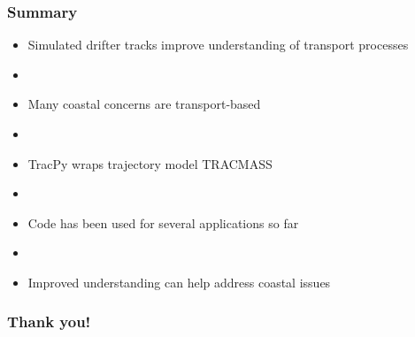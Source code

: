 \documentclass[ignorenonframetext]{beamer}
\begin{document}
\begin{frame}[t]\frametitle{Summary}
    \begin{itemize}
    	\item {\Large Simulated drifter tracks improve understanding of transport processes}
    	\item[] ~
    	\item {\Large Many coastal concerns are transport-based}
    	\item[] ~
    	\item {\Large TracPy wraps trajectory model TRACMASS}
    	\item[] ~
    	\item {\Large Code has been used for several applications so far}
    	\item[] ~
    	\item {\Large Improved understanding can help address coastal issues}
    \end{itemize}
\end{frame}


\begin{frame}
	\frametitle{Thank you!}
	\begin{figure}[htbp]
		\centering
	\end{figure}
\end{frame}
\end{document}
